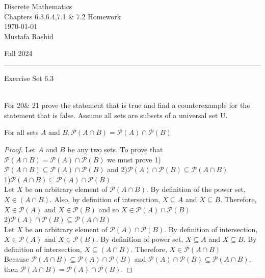 \documentclass[12pt,letterpaper, onecolumn]{exam}
\begin{document}
	
	\begingroup  
	\noindent\LARGE Discrete Mathematics\\
	\noindent\LARGE Chapters 6.3,6.4,7.1 \& 7.2 Homework\\
	\noindent\large \today\\
	\noindent\large Mustafa Rashid\par
	\noindent\large Fall 2024\par
	\endgroup
	\rule{\textwidth}{0.4pt}
	\pointsdroppedatright
	\printanswers
	\renewcommand{\solutiontitle}{\noindent\textbf{Ans:}\enspace}  
	
	\centerline{Exercise Set 6.3}\\
	\noindent For 20\& 21 prove the statement that is true and find a counterexample for the statement that is false. Assume all sets are subsets of a universal set U.
\begin{questions}
	\setcounter{question}{19}\question For all sets $A$ and $B, \mathscr{P}(A \cap B)=\mathscr{P}(A)\cap \mathscr{P}(B)$
	\begin{solution}
		\begin{proof}
		Let $A$ and $B$ be any two sets. To prove that $\mathscr{P}(A \cap B)=\mathscr{P}(A)\cap \mathscr{P}(B)$ we must prove 1)$\mathscr{P}(A \cap B)\subseteq\mathscr{P}(A)\cap \mathscr{P}(B)$ and 2)$\mathscr{P}(A)\cap \mathscr{P}(B)\subseteq\mathscr{P}(A \cap B)$\\
		 1)$\mathscr{P}(A \cap B)\subseteq\mathscr{P}(A)\cap \mathscr{P}(B)$\\
		Let $X$ be an arbitrary element of $\mathscr{P}(A \cap B)$. By definition of the power set, $X\in(A\cap B)$. Also, by definition of intersection, $X\subseteq A$ and $X\subseteq B$. Therefore, $X\in\mathscr{P}(A)$ and 
		 $X\in\mathscr{P}(B)$ and so $X\in\mathscr{P}(A)\cap\mathscr{P}(B)$\\
		2)$\mathscr{P}(A)\cap \mathscr{P}(B)\subseteq\mathscr{P}(A \cap B)$\\
		Let $X$ be an arbitrary element of $\mathscr{P}(A)\cap \mathscr{P}(B)$. By definition of intersection, $X\in\mathscr{P}(A)$ and $X\in\mathscr{P}(B)$. By definition of power set, $X\subseteq A$ and $X\subseteq B$. By definition of intersection, $X\subseteq (A\cap B)$. Therefore, $X\in\mathscr{P}(A\cap B)$\\
		Because $\mathscr{P}(A \cap B)\subseteq\mathscr{P}(A)\cap \mathscr{P}(B)$ and $\mathscr{P}(A)\cap \mathscr{P}(B)\subseteq\mathscr{P}(A \cap B)$, then $\mathscr{P}(A \cap B)=\mathscr{P}(A)\cap \mathscr{P}(B)$.
		\end{proof}
	\end{solution}

\end{questions}
\end{document}
